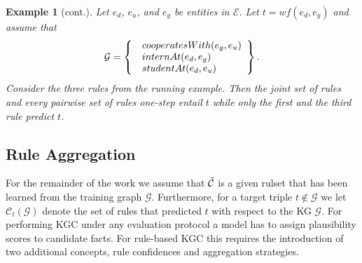 \documentclass{article}
\theoremstyle{plain}
\newtheorem{example}[theorem]{Example}
\theoremstyle{remark}
\newcommand{\allatomrules}{\Tilde{\mathcal{C}}}
\newcommand{\triple}{t}
\newcommand{\alltriples}{\mathcal{G}}
\newcommand{\tFiredAtomRulesG}{\mathcal{C}_\triple(\alltriples)}
\begin{document}
\begin{example}[cont.] \label{ex:prediction-and-one-step}
Let $e_d$, $e_u$, and $e_g$ be entities in $\mathcal{E}$.
Let $\triple = wf(e_d,e_g)$ and assume that
\begin{equation*}
\mathcal{G}=\left\{
  \begin{array}{@{}ll@{}ll@{}}
    & cooperatesWith(e_g, e_u) &  \\
    & internAt(e_d, e_g) &  \\
    & studentAt(e_d, e_u) &  
  \end{array}\right\}.
\end{equation*}
Consider the three rules from the running example. Then the joint set of rules and every pairwise set of rules one-step entail $\triple$ while only the first and the third rule predict $\triple$.  



\end{example}
\subsection{Rule Aggregation} \label{sec: Aggregation}
For the remainder of the work we assume that $\allatomrules$ is a given rulset that has been learned from the training graph $\alltriples$. Furthermore, for a target triple $\triple \notin \alltriples$ we let $\tFiredAtomRulesG$ denote the set of rules that predicted $\triple$ with respect to the KG $\alltriples$.
For performing KGC under any evaluation protocol a model has to assign plausibility scores to candidate facts. For rule-based KGC this requires the introduction of two additional concepts, rule confidences and aggregation strategies. 

\end{document}
